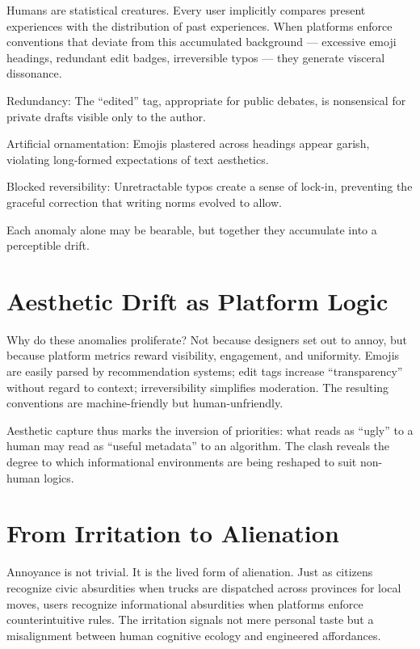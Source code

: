 \documentclass{book}
\begin{document}
Humans are statistical creatures. Every user implicitly compares present experiences with the distribution of past experiences. When platforms enforce conventions that deviate from this accumulated background — excessive emoji headings, redundant edit badges, irreversible typos — they generate visceral dissonance.

Redundancy: The “edited” tag, appropriate for public debates, is nonsensical for private drafts visible only to the author.

Artificial ornamentation: Emojis plastered across headings appear garish, violating long-formed expectations of text aesthetics.

Blocked reversibility: Unretractable typos create a sense of lock-in, preventing the graceful correction that writing norms evolved to allow.

Each anomaly alone may be bearable, but together they accumulate into a perceptible drift.

\section{Aesthetic Drift as Platform Logic}

Why do these anomalies proliferate? Not because designers set out to annoy, but because platform metrics reward visibility, engagement, and uniformity. Emojis are easily parsed by recommendation systems; edit tags increase “transparency” without regard to context; irreversibility simplifies moderation. The resulting conventions are machine-friendly but human-unfriendly.

Aesthetic capture thus marks the inversion of priorities: what reads as “ugly” to a human may read as “useful metadata” to an algorithm. The clash reveals the degree to which informational environments are being reshaped to suit non-human logics.

\section{From Irritation to Alienation}

Annoyance is not trivial. It is the lived form of alienation. Just as citizens recognize civic absurdities when trucks are dispatched across provinces for local moves, users recognize informational absurdities when platforms enforce counterintuitive rules. The irritation signals not mere personal taste but a misalignment between human cognitive ecology and engineered affordances.
\end{document}
